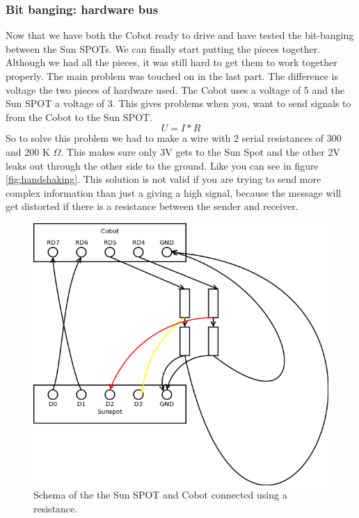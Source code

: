 \documentclass[a4paper,10pt]{article} %
\begin{document}

\subsubsection{Bit banging: hardware bus} %

Now that we have both the Cobot ready to drive and have tested the bit-banging between the
Sun SPOTs. We can finally start putting the pieces together. Although we had all
the pieces, it was still hard to get them to work together properly.  The main
problem was touched on in the last part. The difference is voltage the two
pieces of hardware used. The Cobot uses a voltage of 5 and the Sun SPOT a
voltage of 3. This gives problems when you, want to send signals to from the
Cobot to the Sun SPOT.  \begin{equation} \label{eq:voltage} U = I*R
\end{equation}
So to solve this problem we had to make a wire with 2 serial resistances of 300
and 200 K $\Omega$. This makes sure only 3V gets to the Sun Spot and the
other 2V leaks out through the other side to the ground. Like you can see in
figure \ref{fig:handshaking}.
This solution is not valid if you are trying to send more complex information
than just a giving a high signal, because the message will get distorted if
there is a resistance between the sender and receiver.

\begin{figure}[H]
\label{fig:connection-schema}
\centering
\includegraphics[scale=0.5]{img/connection-schema.png}
\caption{Schema of the the Sun SPOT and Cobot connected using a resistance.}
\end{figure}
\end{document}
